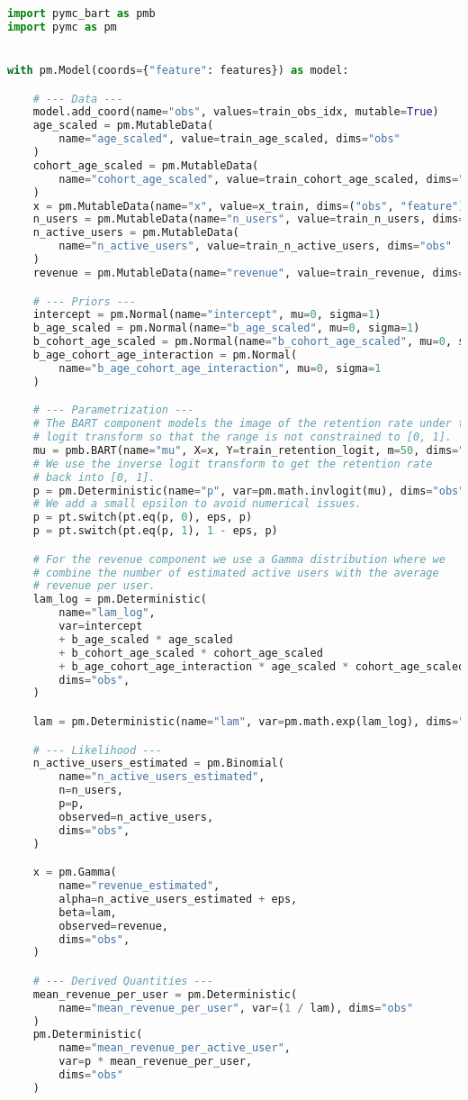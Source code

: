 \documentclass[11pt]{amsart}
\theoremstyle{definition}
\begin{document}
\begin{lstlisting}[language=Python, caption=PyMC model implementation.]
import pymc_bart as pmb
import pymc as pm


with pm.Model(coords={"feature": features}) as model:

    # --- Data ---
    model.add_coord(name="obs", values=train_obs_idx, mutable=True)
    age_scaled = pm.MutableData(
        name="age_scaled", value=train_age_scaled, dims="obs"
    )
    cohort_age_scaled = pm.MutableData(
        name="cohort_age_scaled", value=train_cohort_age_scaled, dims="obs"
    )
    x = pm.MutableData(name="x", value=x_train, dims=("obs", "feature"))
    n_users = pm.MutableData(name="n_users", value=train_n_users, dims="obs")
    n_active_users = pm.MutableData(
        name="n_active_users", value=train_n_active_users, dims="obs"
    )
    revenue = pm.MutableData(name="revenue", value=train_revenue, dims="obs")

    # --- Priors ---
    intercept = pm.Normal(name="intercept", mu=0, sigma=1)
    b_age_scaled = pm.Normal(name="b_age_scaled", mu=0, sigma=1)
    b_cohort_age_scaled = pm.Normal(name="b_cohort_age_scaled", mu=0, sigma=1)
    b_age_cohort_age_interaction = pm.Normal(
        name="b_age_cohort_age_interaction", mu=0, sigma=1
    )

    # --- Parametrization ---
    # The BART component models the image of the retention rate under the
    # logit transform so that the range is not constrained to [0, 1].
    mu = pmb.BART(name="mu", X=x, Y=train_retention_logit, m=50, dims="obs")
    # We use the inverse logit transform to get the retention rate
    # back into [0, 1].
    p = pm.Deterministic(name="p", var=pm.math.invlogit(mu), dims="obs")
    # We add a small epsilon to avoid numerical issues.
    p = pt.switch(pt.eq(p, 0), eps, p)
    p = pt.switch(pt.eq(p, 1), 1 - eps, p)

    # For the revenue component we use a Gamma distribution where we
    # combine the number of estimated active users with the average
    # revenue per user.
    lam_log = pm.Deterministic(
        name="lam_log",
        var=intercept
        + b_age_scaled * age_scaled
        + b_cohort_age_scaled * cohort_age_scaled
        + b_age_cohort_age_interaction * age_scaled * cohort_age_scaled,
        dims="obs",
    )

    lam = pm.Deterministic(name="lam", var=pm.math.exp(lam_log), dims="obs")

    # --- Likelihood ---
    n_active_users_estimated = pm.Binomial(
        name="n_active_users_estimated",
        n=n_users,
        p=p,
        observed=n_active_users,
        dims="obs",
    )

    x = pm.Gamma(
        name="revenue_estimated",
        alpha=n_active_users_estimated + eps,
        beta=lam,
        observed=revenue,
        dims="obs",
    )

    # --- Derived Quantities ---
    mean_revenue_per_user = pm.Deterministic(
        name="mean_revenue_per_user", var=(1 / lam), dims="obs"
    )
    pm.Deterministic(
        name="mean_revenue_per_active_user",
        var=p * mean_revenue_per_user,
        dims="obs"
    )
\end{lstlisting}




\end{document}
